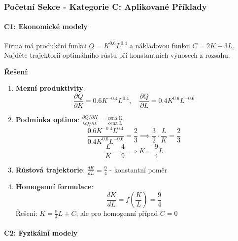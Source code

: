 \subsubsection{Početní Sekce - Kategorie C: Aplikované Příklady}
\label{subsubsec:pocetni-kategorie-c-homog}

\paragraph*{C1: Ekonomické modely}

\begin{example}
Firma má produkční funkci $Q = K^{0.6}L^{0.4}$ a nákladovou funkci $C = 2K + 3L$. Najděte trajektorii optimálního růstu při konstantních výnosech z rozsahu.
\vspace{0.3\baselineskip}

\textbf{Řešení}: 
\begin{enumerate}
\item \textbf{Mezní produktivity}:
\[
\frac{\partial Q}{\partial K} = 0.6K^{-0.4}L^{0.4}, \quad \frac{\partial Q}{\partial L} = 0.4K^{0.6}L^{-0.6}
\]

\item \textbf{Podmínka optima}: $\frac{\partial Q/\partial K}{\partial Q/\partial L} = \frac{\text{cena K}}{\text{cena L}}$
\[
\frac{0.6K^{-0.4}L^{0.4}}{0.4K^{0.6}L^{-0.6}} = \frac{2}{3} \implies \frac{3}{2}\cdot\frac{L}{K} = \frac{2}{3}
\]
\[
\frac{L}{K} = \frac{4}{9} \implies K = \frac{9}{4}L
\]

\item \textbf{Růstová trajektorie}: $\frac{dK}{dL} = \frac{9}{4}$ - konstantní poměr

\item \textbf{Homogenní formulace}: 
\[
\frac{dK}{dL} = f\left(\frac{K}{L}\right) = \frac{9}{4}
\]
Řešení: $K = \frac{9}{4}L + C$, ale pro homogenní případ $C = 0$
\end{enumerate}
\end{example}

\vspace{0.8\baselineskip}

\paragraph*{C2: Fyzikální modely}

